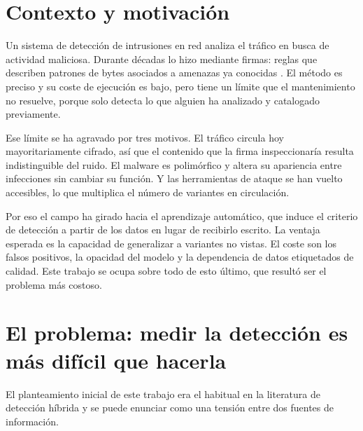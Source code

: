 %

\section{Contexto y motivación}
\label{sec:contexto}

Un sistema de detección de intrusiones en red analiza el tráfico en busca de
actividad maliciosa. Durante décadas lo hizo mediante firmas: reglas que
describen patrones de bytes asociados a amenazas ya conocidas
\cite{Swarnkar2023}. El método es preciso y su coste de ejecución es bajo, pero
tiene un límite que el mantenimiento no resuelve, porque solo detecta lo que
alguien ha analizado y catalogado previamente.

Ese límite se ha agravado por tres motivos. El tráfico circula hoy
mayoritariamente cifrado, así que el contenido que la firma inspeccionaría
resulta indistinguible del ruido. El malware es polimórfico y altera su
apariencia entre infecciones sin cambiar su función. Y las herramientas de
ataque se han vuelto accesibles, lo que multiplica el número de variantes en
circulación.

Por eso el campo ha girado hacia el aprendizaje automático, que induce el
criterio de detección a partir de los datos en lugar de recibirlo escrito. La
ventaja esperada es la capacidad de generalizar a variantes no vistas. El coste
son los falsos positivos, la opacidad del modelo y la dependencia de datos
etiquetados de calidad. Este trabajo se ocupa sobre todo de esto último, que
resultó ser el problema más costoso.

\section{El problema: medir la detección es más difícil que hacerla}
\label{sec:problema}

El planteamiento inicial de este trabajo era el habitual en la literatura de
detección híbrida y se puede enunciar como una tensión entre dos fuentes de
información.

